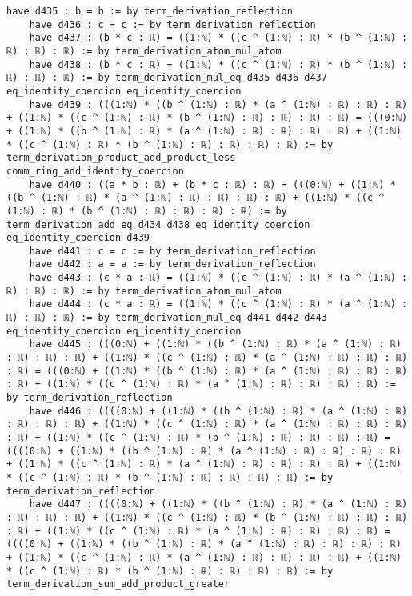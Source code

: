 \documentclass{article}
\begin{document}
\begin{tcolorbox}[colback=white!10, width=\linewidth]
\begin{lstlisting}[language=Lean4]
    have d435 : b = b := by term_derivation_reflection
    have d436 : c = c := by term_derivation_reflection
    have d437 : (b * c : ℝ) = ((1:ℕ) * ((c ^ (1:ℕ) : ℝ) * (b ^ (1:ℕ) : ℝ) : ℝ) : ℝ) := by term_derivation_atom_mul_atom
    have d438 : (b * c : ℝ) = ((1:ℕ) * ((c ^ (1:ℕ) : ℝ) * (b ^ (1:ℕ) : ℝ) : ℝ) : ℝ) := by term_derivation_mul_eq d435 d436 d437 eq_identity_coercion eq_identity_coercion
    have d439 : (((1:ℕ) * ((b ^ (1:ℕ) : ℝ) * (a ^ (1:ℕ) : ℝ) : ℝ) : ℝ) + ((1:ℕ) * ((c ^ (1:ℕ) : ℝ) * (b ^ (1:ℕ) : ℝ) : ℝ) : ℝ) : ℝ) = (((0:ℕ) + ((1:ℕ) * ((b ^ (1:ℕ) : ℝ) * (a ^ (1:ℕ) : ℝ) : ℝ) : ℝ) : ℝ) + ((1:ℕ) * ((c ^ (1:ℕ) : ℝ) * (b ^ (1:ℕ) : ℝ) : ℝ) : ℝ) : ℝ) := by term_derivation_product_add_product_less comm_ring_add_identity_coercion
    have d440 : ((a * b : ℝ) + (b * c : ℝ) : ℝ) = (((0:ℕ) + ((1:ℕ) * ((b ^ (1:ℕ) : ℝ) * (a ^ (1:ℕ) : ℝ) : ℝ) : ℝ) : ℝ) + ((1:ℕ) * ((c ^ (1:ℕ) : ℝ) * (b ^ (1:ℕ) : ℝ) : ℝ) : ℝ) : ℝ) := by term_derivation_add_eq d434 d438 eq_identity_coercion eq_identity_coercion d439
    have d441 : c = c := by term_derivation_reflection
    have d442 : a = a := by term_derivation_reflection
    have d443 : (c * a : ℝ) = ((1:ℕ) * ((c ^ (1:ℕ) : ℝ) * (a ^ (1:ℕ) : ℝ) : ℝ) : ℝ) := by term_derivation_atom_mul_atom
    have d444 : (c * a : ℝ) = ((1:ℕ) * ((c ^ (1:ℕ) : ℝ) * (a ^ (1:ℕ) : ℝ) : ℝ) : ℝ) := by term_derivation_mul_eq d441 d442 d443 eq_identity_coercion eq_identity_coercion
    have d445 : (((0:ℕ) + ((1:ℕ) * ((b ^ (1:ℕ) : ℝ) * (a ^ (1:ℕ) : ℝ) : ℝ) : ℝ) : ℝ) + ((1:ℕ) * ((c ^ (1:ℕ) : ℝ) * (a ^ (1:ℕ) : ℝ) : ℝ) : ℝ) : ℝ) = (((0:ℕ) + ((1:ℕ) * ((b ^ (1:ℕ) : ℝ) * (a ^ (1:ℕ) : ℝ) : ℝ) : ℝ) : ℝ) + ((1:ℕ) * ((c ^ (1:ℕ) : ℝ) * (a ^ (1:ℕ) : ℝ) : ℝ) : ℝ) : ℝ) := by term_derivation_reflection
    have d446 : ((((0:ℕ) + ((1:ℕ) * ((b ^ (1:ℕ) : ℝ) * (a ^ (1:ℕ) : ℝ) : ℝ) : ℝ) : ℝ) + ((1:ℕ) * ((c ^ (1:ℕ) : ℝ) * (a ^ (1:ℕ) : ℝ) : ℝ) : ℝ) : ℝ) + ((1:ℕ) * ((c ^ (1:ℕ) : ℝ) * (b ^ (1:ℕ) : ℝ) : ℝ) : ℝ) : ℝ) = ((((0:ℕ) + ((1:ℕ) * ((b ^ (1:ℕ) : ℝ) * (a ^ (1:ℕ) : ℝ) : ℝ) : ℝ) : ℝ) + ((1:ℕ) * ((c ^ (1:ℕ) : ℝ) * (a ^ (1:ℕ) : ℝ) : ℝ) : ℝ) : ℝ) + ((1:ℕ) * ((c ^ (1:ℕ) : ℝ) * (b ^ (1:ℕ) : ℝ) : ℝ) : ℝ) : ℝ) := by term_derivation_reflection
    have d447 : ((((0:ℕ) + ((1:ℕ) * ((b ^ (1:ℕ) : ℝ) * (a ^ (1:ℕ) : ℝ) : ℝ) : ℝ) : ℝ) + ((1:ℕ) * ((c ^ (1:ℕ) : ℝ) * (b ^ (1:ℕ) : ℝ) : ℝ) : ℝ) : ℝ) + ((1:ℕ) * ((c ^ (1:ℕ) : ℝ) * (a ^ (1:ℕ) : ℝ) : ℝ) : ℝ) : ℝ) = ((((0:ℕ) + ((1:ℕ) * ((b ^ (1:ℕ) : ℝ) * (a ^ (1:ℕ) : ℝ) : ℝ) : ℝ) : ℝ) + ((1:ℕ) * ((c ^ (1:ℕ) : ℝ) * (a ^ (1:ℕ) : ℝ) : ℝ) : ℝ) : ℝ) + ((1:ℕ) * ((c ^ (1:ℕ) : ℝ) * (b ^ (1:ℕ) : ℝ) : ℝ) : ℝ) : ℝ) := by term_derivation_sum_add_product_greater

\end{lstlisting}
\end{tcolorbox}
\end{document}
